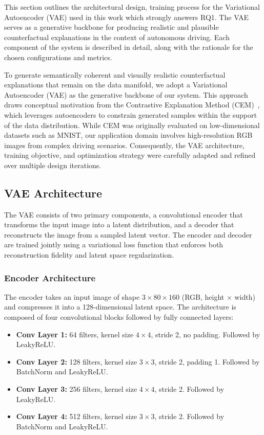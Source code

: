 This section outlines the architectural design, training process for the Variational Autoencoder (VAE) used in this work which strongly answers RQ1. The VAE serves as a generative backbone for producing realistic and plausible counterfactual explanations in the context of autonomous driving. Each component of the system is described in detail, along with the rationale for the chosen configurations and metrics.

To generate semantically coherent and visually realistic counterfactual explanations that remain on the data manifold, we adopt a Variational Autoencoder (VAE) as the generative backbone of our system. This approach draws conceptual motivation from the Contrastive Explanation Method (CEM)~\cite{DBLP:journals/corr/abs-1802-07623}, which leverages autoencoders to constrain generated samples within the support of the data distribution. While CEM was originally evaluated on low-dimensional datasets such as MNIST, our application domain involves high-resolution RGB images from complex driving scenarios. Consequently, the VAE architecture, training objective, and optimization strategy were carefully adapted and refined over multiple design iterations.

\subsection{VAE Architecture} \label{sec:vae_architecture}

The VAE consists of two primary components, a convolutional encoder that transforms the input image into a latent distribution, and a decoder that reconstructs the image from a sampled latent vector. The encoder and decoder are trained jointly using a variational loss function that enforces both reconstruction fidelity and latent space regularization.

\subsubsection{Encoder Architecture} \label{subsubsec:vae_encoder}

The encoder takes an input image of shape $3 \times 80 \times 160$ (RGB, height $\times$ width) and compresses it into a 128-dimensional latent space. The architecture is composed of four convolutional blocks followed by fully connected layers:

\begin{itemize}
    \item \textbf{Conv Layer 1:} 64 filters, kernel size $4 \times 4$, stride 2, no padding. Followed by LeakyReLU.
    \item \textbf{Conv Layer 2:} 128 filters, kernel size $3 \times 3$, stride 2, padding 1. Followed by BatchNorm and LeakyReLU.
    \item \textbf{Conv Layer 3:} 256 filters, kernel size $4 \times 4$, stride 2. Followed by LeakyReLU.
    \item \textbf{Conv Layer 4:} 512 filters, kernel size $3 \times 3$, stride 2. Followed by BatchNorm and LeakyReLU.
\end{itemize}

